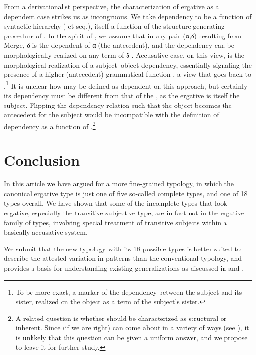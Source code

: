 \documentclass[output=paper]{langsci/langscibook}
\begin{document}
From a derivationalist perspective, the characterization of ergative as a
dependent case strikes us as incongruous. We take dependency to be a function
of syntactic hierarchy (\citealt{Zwart2004} et seq.), itself a function of the
structure generating procedure  of \citet{Chomsky1993}. In the spirit of
\citet{Epstein1999}, we assume that in any pair (α,δ) resulting from Merge, δ
is the dependent of α (the antecedent), and the dependency can be
morphologically realized on any term of δ \citep{Zwart2006b}. Accusative case,
on this view, is the morphological realization of a subject--object dependency,
essentially signaling the presence of a higher (antecedent) grammatical
function \citep{Zwart2006a}, a view that goes back to
\citet{Jakobson1936}.\footnote{To be more exact, a marker of the dependency
between the subject and its sister, realized on the object as a term of the
subject’s sister.\label{fn:29}} It is unclear how  may be defined
as dependent on this approach, but certainly its dependency must be different
from that of the , as the ergative is itself the subject.
Flipping the dependency relation such that the object becomes the antecedent
for the subject would be incompatible with the definition of dependency as a
function of .\footnote{A related question is whether  should
    be characterized as structural or inherent. Since (if we are right)
     can come about in a variety of ways (see
    ), it is unlikely that this question can be given a
uniform answer, and we propose to leave it for further study.\label{fn:30}}

\section{Conclusion}\label{sec:key:11.7}

In this article we have argued for a more fine-grained  typology, in
which  the canonical ergative  type is just one of five so-called
complete types, and one of 18 types overall. We have shown that some of the
incomplete types that look ergative, especially the transitive subjective type,
are in fact not in the ergative family of types, involving special treatment of
transitive subjects within a basically accusative  system.

We submit that the new  typology with its 18 possible types is better
suited to describe the attested variation in  patterns than the
conventional  typology, and provides a basis for understanding
existing  generalizations as discussed in \citet{Sheehan2014} and
\citet{Deal2015}.
\end{document}
